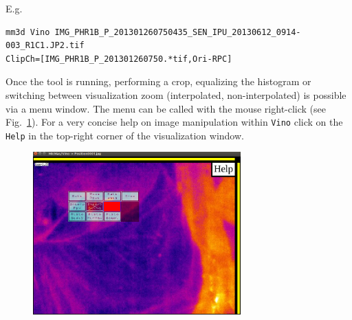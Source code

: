 \vspace{0.25cm}
\noindent
E.g. 
\begin{verbatim}
mm3d Vino IMG_PHR1B_P_201301260750435_SEN_IPU_20130612_0914-003_R1C1.JP2.tif
ClipCh=[IMG_PHR1B_P_201301260750.*tif,Ori-RPC]
\end{verbatim}
%
\vspace{0.5cm}
Once the tool is running, performing a crop, equalizing the histogram or switching between visualization zoom (interpolated, non-interpolated) is possible via a menu window. The menu can be called with the mouse right-click (see Fig.~\ref{FIG:Vino}). For a very concise help on image manipulation within {\tt Vino} click on the {\tt Help} in the top-right corner of the visualization window.

\begin{figure}[H]
\begin{center}
\includegraphics[width=8cm]{FIGS/Vino/Vino_menu.png}
\label{FIG:Vino}
\end{center}
\end{figure}

